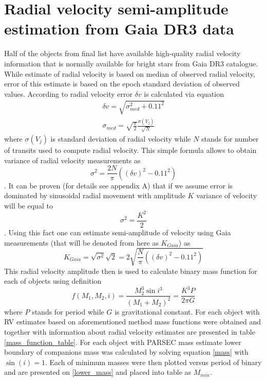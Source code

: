 \documentclass{pracalicmgr}
\begin{document}
\section{Radial velocity semi-amplitude estimation from Gaia DR3 data}
Half of the objects from final list have available high-quality radial velocity information that is normally available for bright stars from Gaia DR3 catalogue. While estimate of radial velocity 
is based on median of observed radial velocity, error of this estimate is based on the epoch standard deviation of observed values. According to \citep{katz_gaia_2022} radial velocity error $\delta v$ 
is calculated via equation
\begin{align}
    \delta v=\sqrt{\sigma_{med}^2+0.11^2}\\
    \sigma_{med}=\sqrt{\frac{\pi}{2}}\frac{\sigma(V_j)}{\sqrt{N}}
\end{align}
where $\sigma(V_j)$ is standard deviation of radial velocity while $N$ stands for number of transits used to compute radial velocity. This simple formula allows to obtain variance of 
radial velocity measurements as 
\begin{equation}
    \sigma^2=\frac{2N}{\pi}\left((\delta v)^2-0.11^2\right)
\end{equation}
. It can be proven (for details see appendix A) that if we assume error is dominated by sinusoidal radial movement with amplitude $K$ 
variance of velocity will be equal to
\begin{equation}
    \sigma^2=\frac{K^2}{2}
\end{equation}.
Using this fact one can estimate semi-amplitude of velocity using Gaia measurements (that will be denoted from here as $K_{Gaia}$) as 
\begin{equation}
    K_{Gaia}=\sqrt{\sigma^2}\sqrt{2}=2\sqrt{\frac{N}{\pi}\left((\delta v)^2-0.11^2\right)}
\end{equation}
This radial velocity amplitude then is used to calculate binary mass function for each of objects using definition 
\begin{equation}\label{mass}
    f(M_1,M_2,i)=\frac{M_2^3 \sin{i}^3}{(M_1+M_2)^2}=\frac{K^3 P}{2\pi G}
\end{equation}
where $P$ stands for period while $G$ is gravitational constant. For each object with RV estimates based on aforementioned method mass functions were obtained and together with
information about radial velocity estimates are presented in table \ref{mass_function_table}.
For each object with PARSEC mass estimate lower boundary of companions mass was calculated by solving equation \ref{mass}
with  $\sin{(i)}=1$. Each of minimum masses were then plotted versus period of binary and are presented on \ref{lower_mass}
and placed into table as $M_{min}$.
\end{document}
